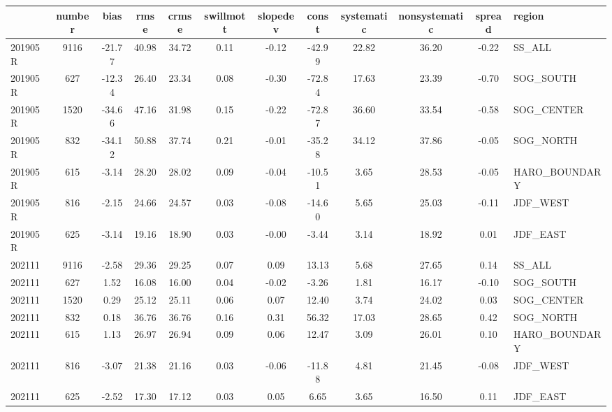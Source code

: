 \begin{tabular}{lccccccccccl}
\toprule
 & number & bias & rmse & crmse & swillmott & slopedev & const & systematic & nonsystematic & spread & region \\
\midrule
201905R & 9116 & -21.77 & 40.98 & 34.72 & 0.11 & -0.12 & -42.99 & 22.82 & 36.20 & -0.22 & SS_ALL \\
201905R & 627 & -12.34 & 26.40 & 23.34 & 0.08 & -0.30 & -72.84 & 17.63 & 23.39 & -0.70 & SOG_SOUTH \\
201905R & 1520 & -34.66 & 47.16 & 31.98 & 0.15 & -0.22 & -72.87 & 36.60 & 33.54 & -0.58 & SOG_CENTER \\
201905R & 832 & -34.12 & 50.88 & 37.74 & 0.21 & -0.01 & -35.28 & 34.12 & 37.86 & -0.05 & SOG_NORTH \\
201905R & 615 & -3.14 & 28.20 & 28.02 & 0.09 & -0.04 & -10.51 & 3.65 & 28.53 & -0.05 & HARO_BOUNDARY \\
201905R & 816 & -2.15 & 24.66 & 24.57 & 0.03 & -0.08 & -14.60 & 5.65 & 25.03 & -0.11 & JDF_WEST \\
201905R & 625 & -3.14 & 19.16 & 18.90 & 0.03 & -0.00 & -3.44 & 3.14 & 18.92 & 0.01 & JDF_EAST \\
202111 & 9116 & -2.58 & 29.36 & 29.25 & 0.07 & 0.09 & 13.13 & 5.68 & 27.65 & 0.14 & SS_ALL \\
202111 & 627 & 1.52 & 16.08 & 16.00 & 0.04 & -0.02 & -3.26 & 1.81 & 16.17 & -0.10 & SOG_SOUTH \\
202111 & 1520 & 0.29 & 25.12 & 25.11 & 0.06 & 0.07 & 12.40 & 3.74 & 24.02 & 0.03 & SOG_CENTER \\
202111 & 832 & 0.18 & 36.76 & 36.76 & 0.16 & 0.31 & 56.32 & 17.03 & 28.65 & 0.42 & SOG_NORTH \\
202111 & 615 & 1.13 & 26.97 & 26.94 & 0.09 & 0.06 & 12.47 & 3.09 & 26.01 & 0.10 & HARO_BOUNDARY \\
202111 & 816 & -3.07 & 21.38 & 21.16 & 0.03 & -0.06 & -11.88 & 4.81 & 21.45 & -0.08 & JDF_WEST \\
202111 & 625 & -2.52 & 17.30 & 17.12 & 0.03 & 0.05 & 6.65 & 3.65 & 16.50 & 0.11 & JDF_EAST \\
\bottomrule
\end{tabular}
